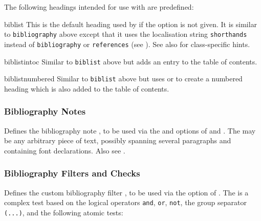 \documentclass{ltxdockit}[2011/03/25]
\begin{document}
The following headings intended for use with  are predefined:

\begin{valuelist*}

\item[biblist]
This is the default heading used by  if the  option is not given. It is similar to \texttt{bibliography} above except that it uses the localisation string \texttt{shorthands} instead of \texttt{bibliography} or \texttt{references} (see ). See also  for class-specific hints.

\item[biblistintoc]
Similar to \texttt{biblist} above but adds an entry to the table of contents.

\item[biblistnumbered]
Similar to \texttt{biblist} above but uses  or  to create a numbered heading which is also added to the table of contents.

\end{valuelist*}

\subsubsection{Bibliography Notes}
\label{use:bib:nts}

\begin{ltxsyntax}


Defines the bibliography note , to be used via the  and  options of  and . The  may be any arbitrary piece of text, possibly spanning several paragraphs and containing font declarations. Also see .

\end{ltxsyntax}

\subsubsection{Bibliography Filters and Checks}
\label{use:bib:flt}

\begin{ltxsyntax}


Defines the custom bibliography filter , to be used via the  option of . The  is a complex test based on the logical operators \texttt{and}, \texttt{or}, \texttt{not}, the group separator \texttt{(...)}, and the following atomic tests:

\end{ltxsyntax}
\end{document}
